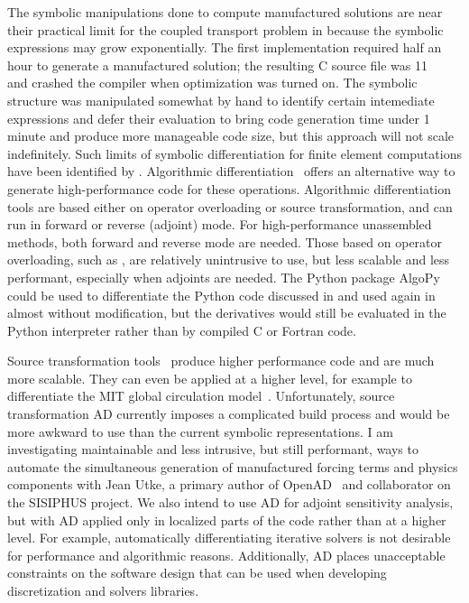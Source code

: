 The symbolic manipulations done to compute manufactured solutions are near their practical limit for the coupled transport problem in  because the symbolic expressions may grow exponentially.
The first implementation required half an hour to generate a manufactured solution; the resulting C source file was \SI{11}{\mega\byte} and crashed the compiler when optimization was turned on.
The symbolic structure was manipulated somewhat by hand to identify certain intemediate expressions and defer their evaluation to bring code generation time under 1 minute and produce more manageable code size, but this approach will not scale indefinitely.
Such limits of symbolic differentiation for finite element computations have been identified by \citet{wang1986finger,fritzson1992need,korelc1997automatic,korelc2002multi,wriggers2008nonlinear}.
Algorithmic differentiation~\citet{griewank2003mathematical,griewank2008evaluating} offers an alternative way to generate high-performance code for these operations.
Algorithmic differentiation tools are based either on operator overloading or source transformation, and can run in forward or reverse (adjoint) mode.
For high-performance unassembled methods, both forward and reverse mode are needed.
Those based on operator overloading, such as \citet{griewank1996adol,griewank1999adol,algopy-web}, are relatively unintrusive to use, but less scalable and less performant, especially when adjoints are needed.
The Python package AlgoPy~\citep{algopy-web,walter2010algorithmic} could be used to differentiate the Python code discussed in  and used again in  almost without modification, but the derivatives would still be evaluated in the Python interpreter rather than by compiled C or Fortran code.

Source transformation tools~\citep{bischof1997adic,utke2008openad} produce higher performance code and are much more scalable.
They can even be applied at a higher level, for example to differentiate the MIT global circulation model~\citep{heimbach2005efficient}.
Unfortunately, source transformation AD currently imposes a complicated build process and would be more awkward to use than the current symbolic representations.
I am investigating maintainable and less intrusive, but still performant, ways to automate the simultaneous generation of manufactured forcing terms and physics components with Jean Utke, a primary author of OpenAD~\citep{openad-userman,utke2004openad} and collaborator on the SISIPHUS project.
We also intend to use AD for adjoint sensitivity analysis, but with AD applied only in localized parts of the code rather than at a higher level.
For example, automatically differentiating iterative solvers is not desirable for performance and algorithmic reasons.
Additionally, AD places unacceptable constraints on the software design that can be used when developing discretization and solvers libraries.

